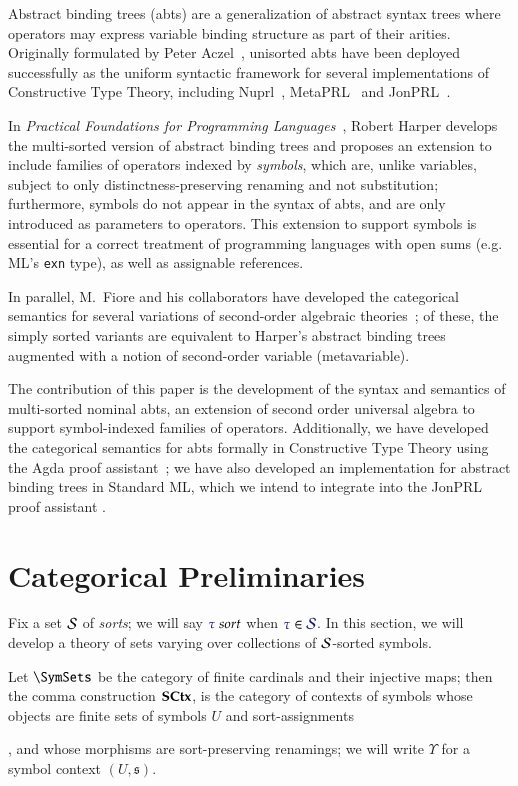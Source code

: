 Abstract binding trees (abts) are a generalization of abstract syntax trees
where operators may express variable binding structure as part of their arities.
Originally formulated by Peter Aczel~\cite{aczel:1978}, unisorted abts have been
deployed successfully as the uniform syntactic framework for several
implementations of Constructive Type Theory, including
Nuprl~\cite{constable:1986}, MetaPRL~\cite{hickey:2003} and
JonPRL~\cite{jonprl:2015}.

In \emph{Practical Foundations for Programming Languages}~\cite{harper:2016},
Robert Harper develops the multi-sorted version of abstract binding trees and
proposes an extension to include families of operators indexed by
\emph{symbols}, which are, unlike variables, subject to only
distinctness-preserving renaming and not substitution; furthermore, symbols do
not appear in the syntax of abts, and are only introduced as parameters to
operators. This extension to support symbols is essential for a correct
treatment of programming languages with open sums (e.g. ML's \texttt{exn} type),
as well as assignable references.

In parallel, M.\ Fiore and his collaborators have developed the categorical
semantics for several variations of second-order algebraic
theories~\cite{fiore:1999,fiore:2005,fiore-hur:2010,fiore-mamoud:2010}; of
these, the simply sorted variants are equivalent to Harper's abstract binding
trees augmented with a notion of second-order variable (metavariable).

The contribution of this paper is the development of the syntax and semantics
of multi-sorted nominal abts, an extension of second order universal algebra to
support symbol-indexed families of operators. Additionally, we have developed
the categorical semantics for abts formally in Constructive Type Theory using
the Agda proof assistant~\cite{norell:2007}; we have also developed an
implementation for abstract binding trees in Standard ML, which we intend to
integrate into the JonPRL proof assistant \cite{jonprl:2015}.

\section{Categorical Preliminaries}

Fix a set $\mathcal{S}$ of \emph{sorts}; we will say $\IsSort{\tau}$ when
$\Member{\tau}{\Sorts}$. In this section, we will develop a theory of sets
varying over collections of $\mathcal{S}$-sorted symbols.

Let $\SymSets$ be the category of finite cardinals and their injective maps;
then the comma construction $\mathbf{SCtx}$, is the category of contexts of symbols
whose objects are finite sets of symbols $U$ and sort-assignments
, and whose morphisms are
sort-preserving renamings; we will write $\Upsilon$ for a symbol context
$(U,\mathfrak{s})$.

